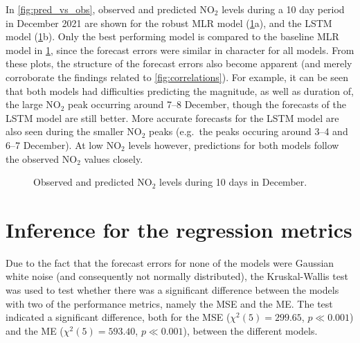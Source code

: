 \noindent
In \vref{fig:pred_vs_obs}, observed and predicted NO$_2$ levels during a 10 day period in December 2021 are shown for the robust MLR model (\cref{fig:pred_vs_obs}a), and the LSTM model (\cref{fig:pred_vs_obs}b). Only the best performing model is compared to the baseline MLR model in \cref{fig:pred_vs_obs}, since the forecast errors were similar in character for all models. From these plots, the structure of the forecast errors also become apparent (and merely corroborate the findings related to \cref{fig:correlations}). For example, it can be seen that both models had difficulties predicting the magnitude, as well as duration of, the large NO$_2$ peak occurring around 7--8 December, though the forecasts of the LSTM model are still better. More accurate forecasts for the LSTM model are also seen during the smaller NO$_2$ peaks (e.g.\ the peaks occuring around 3--4 and 6--7 December). At low NO$_2$ levels however, predictions for both models follow the observed NO$_2$ values closely. 


\begin{figure}[h] 
\begin{center}
\caption{Observed and predicted NO$_2$ levels during 10 days in December.}
\label{fig:pred_vs_obs}
\end{center}
\end{figure}

\section{Inference for the regression metrics}
\label{sec:inference}

Due to the fact that the forecast errors for none of the models were Gaussian white noise (and consequently not normally distributed), the Kruskal-Wallis test was used to test whether there was a significant difference between the models with two of the performance metrics, namely the MSE and the ME. The test indicated a significant difference, both for the MSE ($\chi^2(5) = 299.65$, $p\ll0.001$) and the ME ($\chi^2(5) = 593.40$, $p\ll0.001$), between the different models. 

